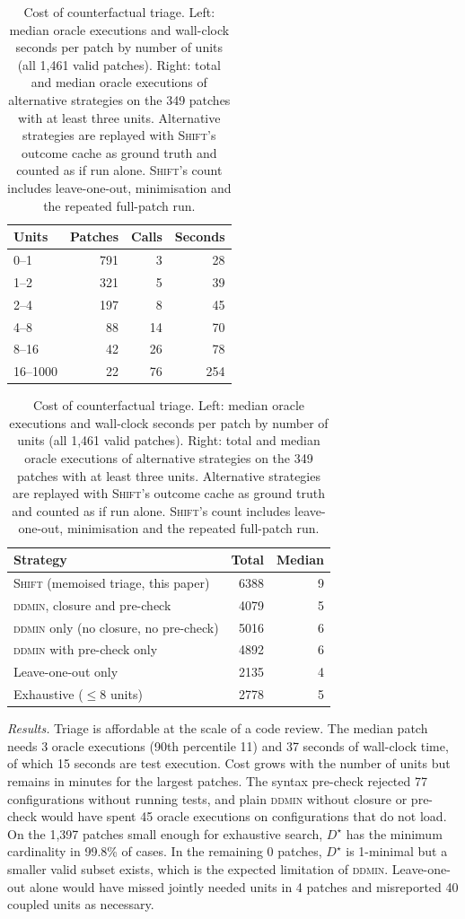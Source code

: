 \documentclass[a4paper,fleqn]{cas-sc}
\newcommand{\tool}{\textsc{Shift}}
\newcommand{\rqfourCallsMedian}{3}
\newcommand{\rqfourCallsPninety}{11}
\newcommand{\rqfourCoupled}{40}
\newcommand{\rqfourExhLarger}{0}
\newcommand{\rqfourExhMatch}{99.8\%}
\newcommand{\rqfourExhN}{1{,}397}
\newcommand{\rqfourOracleSecMedian}{15}
\newcommand{\rqfourPatchesJ}{4}
\newcommand{\rqfourPlainInvalid}{45}
\newcommand{\rqfourPrecheck}{77}
\newcommand{\rqfourWallMedian}{37}
\begin{document}
\begin{table}[t]
\caption{Cost of counterfactual triage. Left: median oracle executions and wall-clock seconds per patch by number of units (all 1{,}461 valid patches). Right: total and median oracle executions of alternative strategies on the 349 patches with at least three units. Alternative strategies are replayed with \tool{}'s outcome cache as ground truth and counted as if run alone. \tool{}'s count includes leave-one-out, minimisation and the repeated full-patch run.}
\label{tab:cost}
\centering\footnotesize
\begin{tabular}{lrrr}
\toprule
Units & Patches & Calls & Seconds \\
\midrule
0--1 & 791 & 3 & 28 \\
1--2 & 321 & 5 & 39 \\
2--4 & 197 & 8 & 45 \\
4--8 & 88 & 14 & 70 \\
8--16 & 42 & 26 & 78 \\
16--1000 & 22 & 76 & 254 \\
\bottomrule
\end{tabular}\hfill
\begin{tabular}{lrr}
\toprule
Strategy & Total & Median \\
\midrule
\tool{} (memoised triage, this paper) & 6388 & 9 \\
\textsc{ddmin}, closure and pre-check & 4079 & 5 \\
\textsc{ddmin} only (no closure, no pre-check) & 5016 & 6 \\
\textsc{ddmin} with pre-check only & 4892 & 6 \\
Leave-one-out only & 2135 & 4 \\
Exhaustive ($\leq$8 units) & 2778 & 5 \\
\bottomrule
\end{tabular}
\end{table}

\emph{Results.} Triage is affordable at the scale of a code review. The median patch needs \rqfourCallsMedian{} oracle executions (90th percentile \rqfourCallsPninety{}) and \rqfourWallMedian{} seconds of wall-clock time, of which \rqfourOracleSecMedian{} seconds are test execution. Cost grows with the number of units but remains in minutes for the largest patches. The syntax pre-check rejected \rqfourPrecheck{} configurations without running tests, and plain \textsc{ddmin} without closure or pre-check would have spent \rqfourPlainInvalid{} oracle executions on configurations that do not load. On the \rqfourExhN{} patches small enough for exhaustive search, $D^\star$ has the minimum cardinality in \rqfourExhMatch{} of cases. In the remaining \rqfourExhLarger{} patches, $D^\star$ is 1-minimal but a smaller valid subset exists, which is the expected limitation of \textsc{ddmin}. Leave-one-out alone would have missed jointly needed units in \rqfourPatchesJ{} patches and misreported \rqfourCoupled{} coupled units as necessary.
\end{document}
